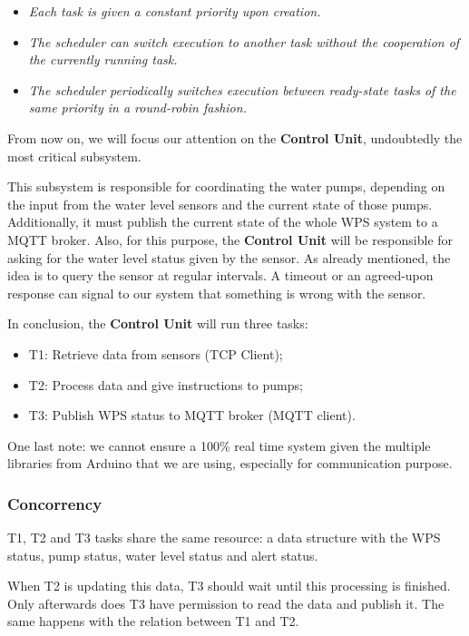 \documentclass[11pt]{article}
\begin{document}
\begin{itemize}
	\item   \textit{Each task is given a constant priority upon creation.}
	\item  \textit{The scheduler can switch execution to another task without the cooperation of the currently running task.}
	\item  \textit{The scheduler periodically switches execution between ready-state tasks of the same priority in a round-robin fashion.} \cite{c1}
\end{itemize}

From now on, we will focus our attention on the \textbf{Control Unit}, undoubtedly the most critical subsystem.

This subsystem is responsible for coordinating the water pumps, depending on the input from the water level sensors and the current state of those pumps.
Additionally, it must publish the current state of the whole WPS system to a MQTT broker.
Also, for this purpose, the \textbf{Control Unit} will be responsible for asking for the water level status given by the sensor. As already mentioned, the idea is to query the sensor at regular intervals. A timeout or an agreed-upon response can signal to our system that something is wrong with the sensor.

In conclusion, the \textbf{Control Unit} will run three tasks:

\begin{itemize}
	\item  T1: Retrieve data from sensors (TCP Client);
	\item  T2: Process data and give instructions to pumps;
	\item  T3: Publish WPS status to MQTT broker (MQTT client).
\end{itemize}

One last note: we cannot ensure a 100\% real time system given the multiple libraries from Arduino that we are using, especially for communication purpose.

\subsubsection{Concorrency}

T1, T2 and T3 tasks share the same resource: a data structure with the WPS status, pump status, water level status and alert status.

When T2 is updating this data, T3 should wait until this processing is finished. Only afterwards does T3 have permission to read the data and publish it.
The same happens with the relation between T1 and T2.
\end{document}
